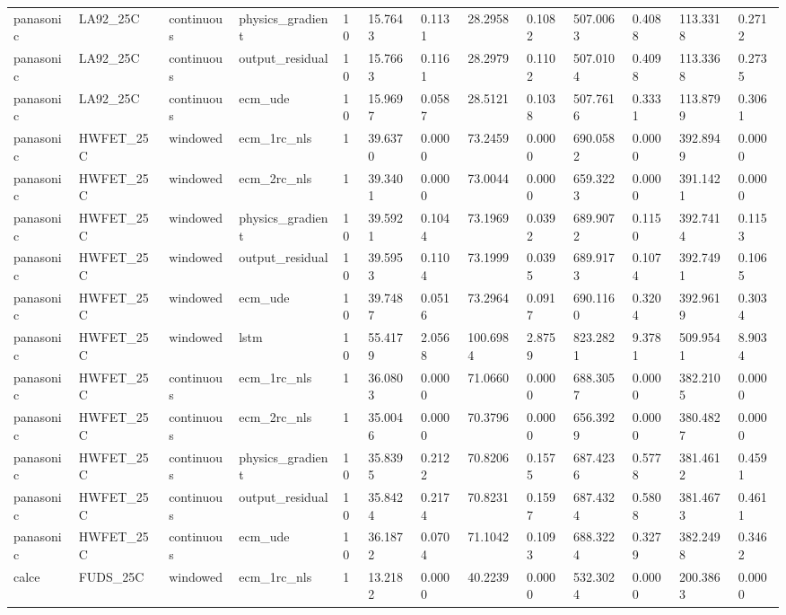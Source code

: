 \begin{tabular}{lllllllllllll}
panasonic & LA92\_25C & continuous & physics\_gradient & 10 & 15.7643 & 0.1131 & 28.2958 & 0.1082 & 507.0063 & 0.4088 & 113.3318 & 0.2712 \\
panasonic & LA92\_25C & continuous & output\_residual & 10 & 15.7663 & 0.1161 & 28.2979 & 0.1102 & 507.0104 & 0.4098 & 113.3368 & 0.2735 \\
panasonic & LA92\_25C & continuous & ecm\_ude & 10 & 15.9697 & 0.0587 & 28.5121 & 0.1038 & 507.7616 & 0.3331 & 113.8799 & 0.3061 \\
panasonic & HWFET\_25C & windowed & ecm\_1rc\_nls & 1 & 39.6370 & 0.0000 & 73.2459 & 0.0000 & 690.0582 & 0.0000 & 392.8949 & 0.0000 \\
panasonic & HWFET\_25C & windowed & ecm\_2rc\_nls & 1 & 39.3401 & 0.0000 & 73.0044 & 0.0000 & 659.3223 & 0.0000 & 391.1421 & 0.0000 \\
panasonic & HWFET\_25C & windowed & physics\_gradient & 10 & 39.5921 & 0.1044 & 73.1969 & 0.0392 & 689.9072 & 0.1150 & 392.7414 & 0.1153 \\
panasonic & HWFET\_25C & windowed & output\_residual & 10 & 39.5953 & 0.1104 & 73.1999 & 0.0395 & 689.9173 & 0.1074 & 392.7491 & 0.1065 \\
panasonic & HWFET\_25C & windowed & ecm\_ude & 10 & 39.7487 & 0.0516 & 73.2964 & 0.0917 & 690.1160 & 0.3204 & 392.9619 & 0.3034 \\
panasonic & HWFET\_25C & windowed & lstm & 10 & 55.4179 & 2.0568 & 100.6984 & 2.8759 & 823.2821 & 9.3781 & 509.9541 & 8.9034 \\
panasonic & HWFET\_25C & continuous & ecm\_1rc\_nls & 1 & 36.0803 & 0.0000 & 71.0660 & 0.0000 & 688.3057 & 0.0000 & 382.2105 & 0.0000 \\
panasonic & HWFET\_25C & continuous & ecm\_2rc\_nls & 1 & 35.0046 & 0.0000 & 70.3796 & 0.0000 & 656.3929 & 0.0000 & 380.4827 & 0.0000 \\
panasonic & HWFET\_25C & continuous & physics\_gradient & 10 & 35.8395 & 0.2122 & 70.8206 & 0.1575 & 687.4236 & 0.5778 & 381.4612 & 0.4591 \\
panasonic & HWFET\_25C & continuous & output\_residual & 10 & 35.8424 & 0.2174 & 70.8231 & 0.1597 & 687.4324 & 0.5808 & 381.4673 & 0.4611 \\
panasonic & HWFET\_25C & continuous & ecm\_ude & 10 & 36.1872 & 0.0704 & 71.1042 & 0.1093 & 688.3224 & 0.3279 & 382.2498 & 0.3462 \\
calce & FUDS\_25C & windowed & ecm\_1rc\_nls & 1 & 13.2182 & 0.0000 & 40.2239 & 0.0000 & 532.3024 & 0.0000 & 200.3863 & 0.0000 \\

\end{tabular}
